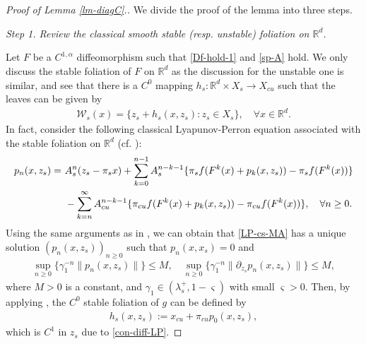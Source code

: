 \documentclass[reqno]{amsart}
\numberwithin{equation}{section}
\begin{document}
\section{}\label{Appen-B}

\begin{proof}[Proof of Lemma {\rm \ref{lm-diagC}}.]
We divide the proof of the lemma into three steps.

{\em Step 1.   Review the classical smooth stable {\rm (}resp. unstable{\rm )} foliation on $\mathbb R^d$.} 

Let $F$ be a $C^{1,\alpha}$ diffeomorphism such that  \eqref{Df-hold-1} and \eqref{sp-A} hold.  
We only discuss the stable foliation of $F$ on $\mathbb R^d$ 
as 
the discussion for the unstable one is similar, and see that there is a $C^{0}$ mapping $h_s:\mathbb R^d \times X_s \to X_{cu}$ such that the leaves can be given by 
\begin{align*}
\mathcal{W}_s(x)=\{z_s+ h_s(x,z_s):z_s\in X_s\},  \quad \forall x \in \mathbb R^d.
\end{align*}
In fact,   consider the following classical Lyapunov-Perron equation associated with the stable  foliation on $\mathbb R^d$ (cf. \cite{CHT-JDE}): 
\begin{align}\label{LP-cs-MA}
p_n(x,z_s)=&~ A_s^n (z_s-\pi_s x) 
+\sum_{k=0}^{n-1} A_s^{n-k-1}
  \{ \pi_s  f(F^k(x)+p_k(x,z_s))- \pi_s f(F^k(x)) \}
\notag \\
&~ - \sum_{k=n}^\infty A_{cu}^{n-k-1} 
 \{ \pi_{cu}  f(F^k(x)+p_k(x,z_s))- \pi_{cu} f(F^k(x)) \}, \quad \forall n\ge 0.
\end{align}
Using the same arguments as in \cite[Section 2]{CHT-JDE}, 
we can obtain that \eqref{LP-cs-MA} has a unique solution
$(p_n(x,z_s))_{n\ge 0}$ such that $p_n(x,x_s)=0$ and
\begin{align}\label{con-diff-LP}
 \sup_{n\ge 0}\{\gamma_1^{-n}\|p_n(x,z_s)\|\}\le M, \quad 
 \sup_{n\ge 0} \{\gamma_1^{-n} \|\partial_{z_s} p_n(x,z_s)\|\}\le M,
\end{align}
where $M>0$ is a constant, and $\gamma_1 \in(\lambda_s^+,1-\varsigma)$ with small $\varsigma>0$.
Then, by applying \cite[Theorem 3.1(v)]{CHT-JDE},  the $C^0$ stable foliation of $g$  can be  defined by 
\begin{align}\label{def-hs}
h_s(x,z_s):=x_{cu}+\pi_{cu} p_0(x,z_s),    
\end{align}
which is $C^1$ in $z_s$ due to \eqref{con-diff-LP}. 


\end{proof}
\end{document}
